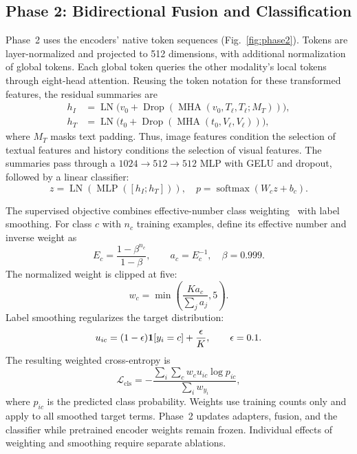 \subsection{Phase 2: Bidirectional Fusion and Classification}
Phase~2 uses the encoders' native token sequences (Fig.~\ref{fig:phase2}). Tokens are layer-normalized and projected to 512 dimensions, with additional normalization of global tokens. Each global token queries the other modality's local tokens through eight-head attention. Reusing the token notation for these transformed features, the residual summaries are
\begin{equation}
\begin{aligned}
h_I&=\operatorname{LN}\big(v_0+\operatorname{Drop}(\operatorname{MHA}(v_0,T_\ell,T_\ell;M_T))\big),\\
h_T&=\operatorname{LN}\big(t_0+\operatorname{Drop}(\operatorname{MHA}(t_0,V_\ell,V_\ell))\big),
\end{aligned}
\label{eq:fusion}
\end{equation}
where $M_T$ masks text padding. Thus, image features condition the selection of textual features and history conditions the selection of visual features. The summaries pass through a $1024\to512\to512$ MLP with GELU and dropout, followed by a linear classifier:
\begin{equation}
z=\operatorname{LN}(\operatorname{MLP}([h_I;h_T])),\quad
p=\operatorname{softmax}(W_cz+b_c).
\end{equation}

The supervised objective combines effective-number class weighting~\cite{Cui2019ClassBalanced} with label smoothing. For class $c$ with $n_c$ training examples, define its effective number and inverse weight as
\begin{equation}
E_c=\frac{1-\beta^{n_c}}{1-\beta},\qquad a_c=E_c^{-1},\quad\beta=0.999.
\end{equation}
The normalized weight is clipped at five:
\begin{equation}
w_c=\min\left(\frac{Ka_c}{\sum_j a_j},5\right).
\end{equation}
Label smoothing regularizes the target distribution:
\begin{equation}
u_{ic}=(1-\epsilon)\mathbf{1}[y_i=c]+\frac{\epsilon}{K},\qquad\epsilon=0.1.
\end{equation}
The resulting weighted cross-entropy is
\begin{equation}
\mathcal L_{\mathrm{cls}}=-\frac{\sum_i\sum_c w_cu_{ic}\log p_{ic}}{\sum_i w_{y_i}},
\label{eq:loss}
\end{equation}
where $p_{ic}$ is the predicted class probability. Weights use training counts only and apply to all smoothed target terms. Phase~2 updates adapters, fusion, and the classifier while pretrained encoder weights remain frozen. Individual effects of weighting and smoothing require separate ablations.

